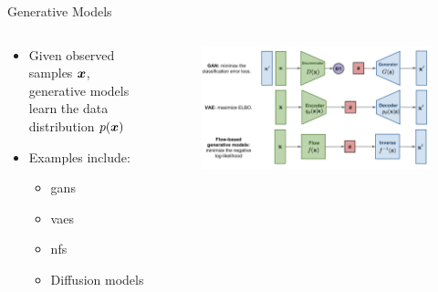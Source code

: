 \begin{frame}{Generative Models}
    \begin{columns}
        \begin{column}{0.5\linewidth}
            \small
            \begin{itemize}
                \item Given observed samples $\boldsymbol{x}$, generative models learn the data distribution $p(\boldsymbol{x})$
                \item Examples include:
                      \begin{itemize}
                          \item \acp{gan}
                          \item \acp{vae}
                          \item \acp{nf}
                          \item Diffusion models
                      \end{itemize}
            \end{itemize}
        \end{column}
        \begin{column}{0.5\linewidth}
            \begin{figure}
                \centering
                \includegraphics[width=\linewidth]{images/generative_models.png}
            \end{figure}
        \end{column}
    \end{columns}
\end{frame}